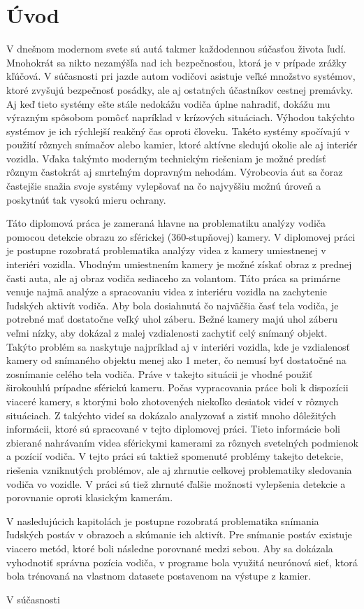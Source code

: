\documentclass[slovak,master,dept460,male,cpp,cpdeclaration]{diploma}
\begin{document}
\MakeTitlePages

\section{Úvod}
\label{sec:Introduction}
V dnešnom modernom svete sú autá takmer každodennou súčasťou života ľudí. Mnohokrát sa nikto nezamýšľa nad ich bezpečnosťou, ktorá je v prípade zrážky kľúčová. V súčasnosti pri jazde autom vodičovi asistuje veľké množstvo systémov, ktoré zvyšujú bezpečnosť posádky, ale aj ostatných účastníkov cestnej premávky. Aj keď tieto systémy ešte stále nedokážu vodiča úplne nahradiť, dokážu mu výrazným spôsobom pomôcť napríklad v krízových situáciach. Výhodou takýchto systémov je ich rýchlejší reakčný čas oproti človeku. Takéto systémy spočívajú v použití rôznych snímačov alebo kamier, ktoré aktívne sledujú okolie ale aj interiér vozidla. Vďaka takýmto moderným technickým riešeniam je možné predísť rôznym  častokrát aj smrteľným dopravným nehodám. Výrobcovia áut sa čoraz častejšie snažia svoje systémy vylepšovať na čo najvyššiu možnú úroveň a poskytnúť tak vysokú mieru ochrany.\par Táto diplomová práca je zameraná hlavne na problematiku analýzy vodiča pomocou detekcie obrazu zo sférickej (360-stupňovej) kamery. V diplomovej práci je postupne rozobratá problematika analýzy videa z kamery umiestnenej v interiéri vozidla. Vhodným umiestnením kamery je možné získať obraz z prednej časti auta, ale aj obraz vodiča sediaceho za volantom. Táto práca sa primárne venuje najmä analýze a spracovaniu videa z interiéru vozidla na zachytenie ľudských aktivít vodiča. Aby bola dosiahnutá čo najväčšia časť tela vodiča, je potrebné mať dostatočne veľký uhol záberu. Bežné kamery majú uhol záberu veľmi nízky, aby dokázal z malej vzdialenosti zachytiť celý snímaný objekt. Takýto problém sa naskytuje najpríklad aj v interiéri vozidla, kde je vzdialenosť kamery od snímaného objektu menej ako 1 meter, čo nemusí byť dostatočné na zosnímanie celého tela vodiča. Práve v takejto situácii je vhodné použiť širokouhlú prípadne sférickú kameru. Počas vypracovania práce boli k dispozícii viaceré kamery, s ktorými bolo zhotovených niekoľko desiatok videí v rôznych situáciach. Z takýchto videí sa dokázalo analyzovať a zistiť mnoho dôležitých informácii, ktoré sú spracované v tejto diplomovej práci. Tieto informácie boli zbierané nahrávaním videa sférickymi kamerami za rôznych svetelných  podmienok a pozícií vodiča. V tejto práci sú taktiež spomenuté problémy takejto detekcie, riešenia vzniknutých problémov, ale aj zhrnutie celkovej problematiky sledovania vodiča vo vozidle. V práci sú tiež zhrnuté ďalšie možnosti vylepšenia detekcie a porovnanie oproti klasickým kamerám.\par V nasledujúcich kapitolách je postupne rozobratá problematika snímania ľudských postáv v obrazoch a skúmanie ich aktivít. Pre snímanie postáv existuje viacero metód, ktoré boli následne porovnané medzi sebou. Aby sa dokázala vyhodnotiť správna pozícia vodiča, v programe bola využitá neurónová sieť, ktorá bola trénovaná na vlastnom datasete postavenom na výstupe z kamier.\par V súčasnosti 
\end{document}
